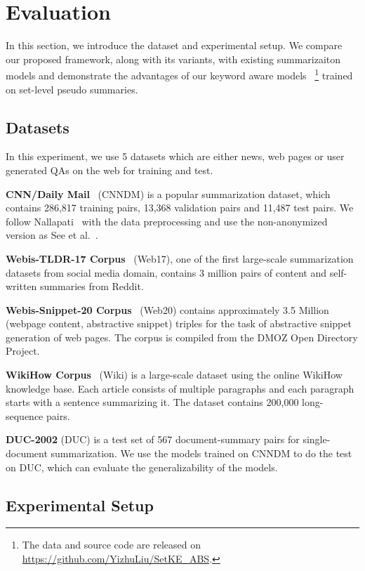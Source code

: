 \section{Evaluation}
\label{sec:eval}
In this section, we introduce the dataset and experimental setup.
We compare our proposed framework, along with its variants,
with existing summarizaiton models 
and demonstrate the advantages of our keyword aware models
~\footnote{The data and source code
are released on \url{https://github.com/YizhuLiu/SetKE_ABS}.}
trained on set-level pseudo summaries.

\subsection{Datasets}
In this experiment, we use 5 datasets which are either 
news, web pages or user generated QAs on the web for training and test.

\textbf{CNN/Daily Mail}~\cite{HermannKGEKSB15} (CNNDM)
is a popular summarization dataset, 
which contains 286,817 training pairs,
13,368 validation pairs and 11,487 test pairs.
We follow Nallapati~ with the data preprocessing
and use the non-anonymized version as See et al.~.

\textbf{Webis-TLDR-17 Corpus}~\cite{tldr17} (Web17), one of the first large-scale summarization datasets from social media domain, contains 3 million pairs of content and self-written summaries from Reddit.

\textbf{Webis-Snippet-20 Corpus}~\cite{AbsSnippet20} (Web20) contains approximately 
3.5 Million (webpage content, abstractive snippet) 
triples for the task of abstractive snippet generation of web pages. 
The corpus is compiled from the DMOZ Open Directory Project.

\textbf{WikiHow Corpus}~\cite{wikihow} (Wiki) is a large-scale dataset using the online WikiHow 
knowledge base. Each article consists of multiple paragraphs and each paragraph starts with a sentence summarizing it. The dataset contains 200,000 long-sequence pairs.

\textbf{DUC-2002} (DUC) is a test set of 567 document-summary pairs for 
single-document summarization. We use the models trained on CNNDM
to do the test on DUC, which can evaluate the generalizability 
of the models.

\subsection{Experimental Setup}
